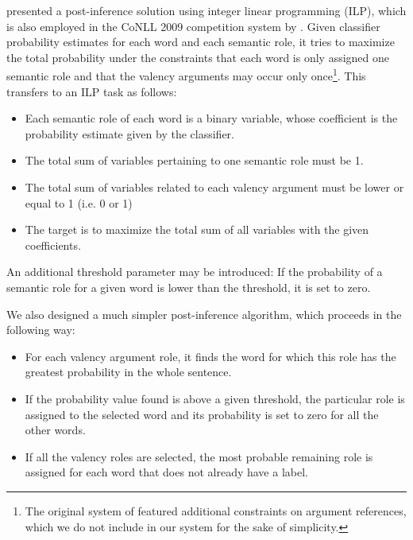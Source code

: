 \documentclass[12pt,notitlepage]{report}
\begin{document}
\citet{punyakanok04} presented a post-inference solution using integer linear programming (ILP), which is also employed in the CoNLL 2009 competition system by \citet{che09}. Given classifier probability estimates for each word and each semantic role, it tries to maximize the total probability under the constraints that each word is only assigned one semantic role and that the valency arguments may occur only once\footnote{The original system of \citet{punyakanok04} featured additional constraints on argument references, which we do not include in our system for the sake of simplicity.}. This transfers to an ILP task as follows:
\begin{itemize}
    \item Each semantic role of each word is a binary variable, whose coefficient is the probability estimate given by the classifier.
    \item The total sum of variables pertaining to one semantic role must be 1.
    \item The total sum of variables related to each valency argument must be lower or equal to 1 (i.e. 0 or 1)
    \item The target is to maximize the total sum of all variables with the given coefficients.
\end{itemize}
An additional threshold parameter may be introduced: If the probability of a semantic role for a given word is lower than the threshold, it is set to zero.

We also designed a much simpler post-inference algorithm, which proceeds in the following way:
\begin{itemize}
    \item For each valency argument role, it finds the word for which this role has the greatest probability in the whole sentence.
    \item If the probability value found is above a given threshold, the particular role is assigned to the selected word and its probability is set to zero for all the other words.
    \item If all the valency roles are selected, the most probable remaining role is assigned for each word that does not already have a label.
\end{itemize}
\end{document}
